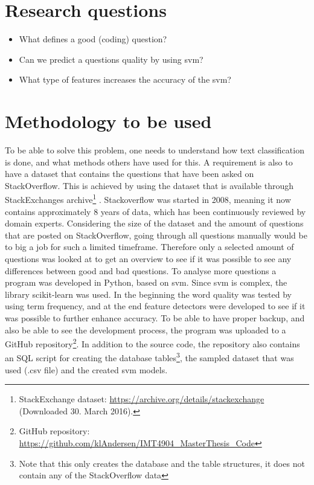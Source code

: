 \section{Research questions}
\label{sec:research_questions}

\begin{itemize}
	\item What defines a good (coding) question?
	\item Can we predict a questions quality by using \gls{svm}?
	\item What type of features increases the accuracy of the \gls{svm}?
\end{itemize}

\section{Methodology to be used}
\label{sec:methodology_to_use}
To be able to solve this problem, one needs to understand how text classification is done, and what methods 
others have used for this. A requirement is also to have a dataset that contains the questions that have 
been asked on StackOverflow. This is achieved by using the dataset that is available through StackExchanges 
archive\footnote{StackExchange dataset: \url{https://archive.org/details/stackexchange} \\ (Downloaded 30. 
	March 2016).} \cite{StackExchange2016}. Stackoverflow was started in 2008, meaning it now contains 
approximately 8 years of data, which has been continuously reviewed by domain experts. 
\vspace{0.5em}\newline
Considering the size of the dataset and the amount of questions that are posted on StackOverflow, going through 
all questions manually would be to big a job for such a limited timeframe. Therefore only a selected amount of 
questions was looked at to get an overview to see if it was possible to see any differences between good and 
bad questions. 
\vspace{0.5em}\newline
To analyse more questions a program was developed in Python, based on \gls{svm}. Since \gls{svm} is complex, the 
library scikit-learn \cite{PedregosaVaroquauxGramfortEtAl2011} was used. In the beginning the word quality was 
tested by using term frequency, and at the end feature detectors were developed to see if it was possible to 
further enhance accuracy.
\vspace{0.5em}\newline
To be able to have proper backup, and also be able to see the development process, the program was uploaded 
to a GitHub repository\footnote{GitHub repository: 
	 \url{https://github.com/klAndersen/IMT4904_MasterThesis_Code}}. In addition to 
the source code, the repository also contains an SQL script for creating the database tables\footnote{Note that 
	this only creates the database and the table structures, it does not contain any of the StackOverflow data}, 
the sampled dataset that was used (.csv file) and the created \gls{svm} models.

